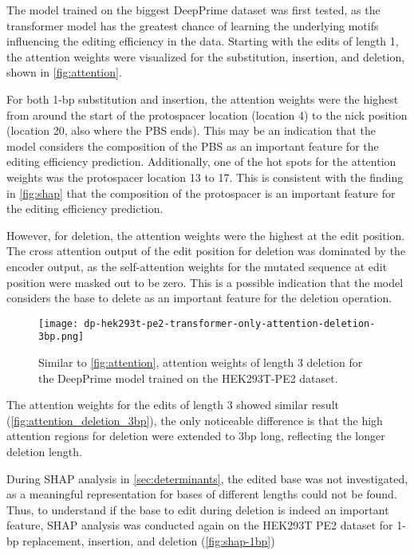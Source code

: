 The model trained on the biggest DeepPrime dataset was first tested, as the transformer model has the greatest chance of learning the underlying motifs influencing the editing efficiency in the data. Starting with the edits of length 1, the attention weights were visualized for the substitution, insertion, and deletion, shown in \autoref{fig:attention}. 

For both 1-bp substitution and insertion, the attention weights were the highest from around the start of the protospacer location (location 4) to the nick position (location 20, also where the PBS ends). This may be an indication that the model considers the composition of the PBS as an important feature for the editing efficiency prediction. Additionally, one of the hot spots for the attention weights was the protospacer location 13 to 17. This is consistent with the finding in \autoref{fig:shap} that the composition of the protospacer is an important feature for the editing efficiency prediction.

However, for deletion, the attention weights were the highest at the edit position. The cross attention output of the edit position for deletion was dominated by the encoder output, as the self-attention weights for the mutated sequence at edit position were masked out to be zero. This is a possible indication that the model considers the base to delete as an important feature for the deletion operation.

\begin{figure}
    \centering
    \texttt{[image: dp-hek293t-pe2-transformer-only-attention-deletion-3bp.png]}
    \caption[Attention weights for 3-bp deletion of the DeepPrime model trained on the HEK293T-PE2 dataset]{Similar to \autoref{fig:attention}, attention weights of length 3 deletion for the DeepPrime model trained on the HEK293T-PE2 dataset.}
    \label{fig:attention_deletion_3bp}
\end{figure}

The attention weights for the edits of length 3 showed similar result (\autoref{fig:attention_deletion_3bp}), the only noticeable difference is that the high attention regions for deletion were extended to 3bp long, reflecting the longer deletion length.

During SHAP analysis in \autoref{sec:determinants}, the edited base was not investigated, as a meaningful representation for bases of different lengths could not be found. Thus, to understand if the base to edit during deletion is indeed an important feature, SHAP analysis was conducted again on the HEK293T PE2 dataset for 1-bp replacement, insertion, and deletion (\autoref{fig:shap-1bp})

